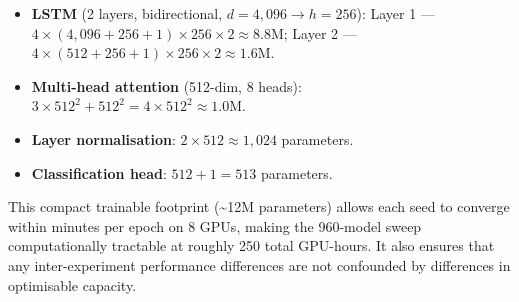 \begin{itemize}
  \item \textbf{LSTM} (2 layers, bidirectional, $d=4{,}096 \to h=256$):
        Layer 1 — $4 \times (4{,}096 + 256 + 1) \times 256 \times 2 \approx 8.8\text{M}$;
        Layer 2 — $4 \times (512 + 256 + 1) \times 256 \times 2 \approx 1.6\text{M}$.
  \item \textbf{Multi-head attention} (512-dim, 8 heads):
        $3 \times 512^2 + 512^2 = 4 \times 512^2 \approx 1.0\text{M}$.
  \item \textbf{Layer normalisation}: $2 \times 512 \approx 1{,}024$ parameters.
  \item \textbf{Classification head}: $512 + 1 = 513$ parameters.
\end{itemize}

\noindent
This compact trainable footprint (\textasciitilde12M parameters) allows each
seed to converge within minutes per epoch on 8 GPUs, making the 960-model
sweep computationally tractable at roughly 250 total GPU-hours.
It also ensures that any inter-experiment performance differences are not
confounded by differences in optimisable capacity.
